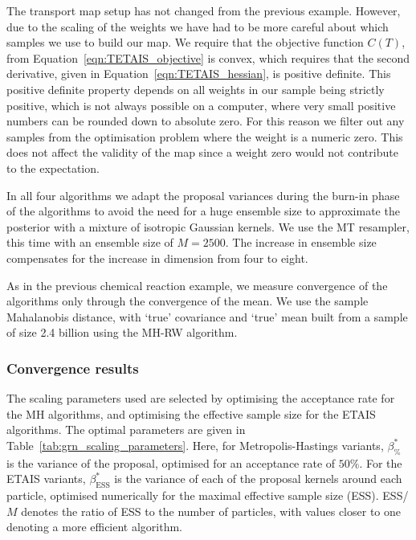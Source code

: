 \documentclass[final]{siamltex}
\newcommand{\edit}[1]{#1}
\begin{document}
The transport map setup has not changed from the previous
example. However, due to the scaling of the weights we have had to be
more careful about which samples we use to build our map. We require
that the objective function $C(T)$, from
Equation~\eqref{eqn:TETAIS_objective} is convex, which requires that
the second derivative, given in Equation~\eqref{eqn:TETAIS_hessian},
is positive definite. This positive definite property depends on all
weights in our sample being strictly positive, which is not always
possible on a computer, where very small positive numbers can be
rounded down to absolute zero. For this reason we filter out any samples from the optimisation problem where the weight is a numeric zero. This does not affect the validity of the map since a weight zero would not contribute to the expectation.

In all \edit{four} algorithms we adapt the proposal variances during the
burn-in phase of the algorithms to avoid the need for a huge ensemble size to approximate the posterior with a mixture of isotropic Gaussian kernels.
We use the MT resampler, this time with an ensemble size of $M=2500$. The increase in ensemble size compensates for the increase in dimension from four to eight.

As in the previous chemical reaction example, we measure convergence of the algorithms only through the convergence of the mean. We use the sample Mahalanobis distance, with `true' covariance and `true' mean built from a sample of size 2.4 billion using the MH-RW algorithm.

\subsubsection{Convergence results}

The scaling parameters used are selected by optimising the acceptance
rate for the MH algorithms, and optimising the effective sample size
for the ETAIS algorithms. The optimal parameters are given in
Table~\ref{tab:grn_scaling_parameters}. Here, for Metropolis-Hastings
variants, $\beta_{\%}^*$ is the variance of the proposal, optimised
for an acceptance rate of $50\%$. For the ETAIS variants,
$\beta_{\text{ESS}}^*$ is the variance of each of the proposal kernels
around each particle, optimised numerically for the maximal effective
sample size (ESS). ESS/$M$ denotes the ratio of ESS to the number of
particles, with values closer to one denoting a more efficient algorithm.
\end{document}
